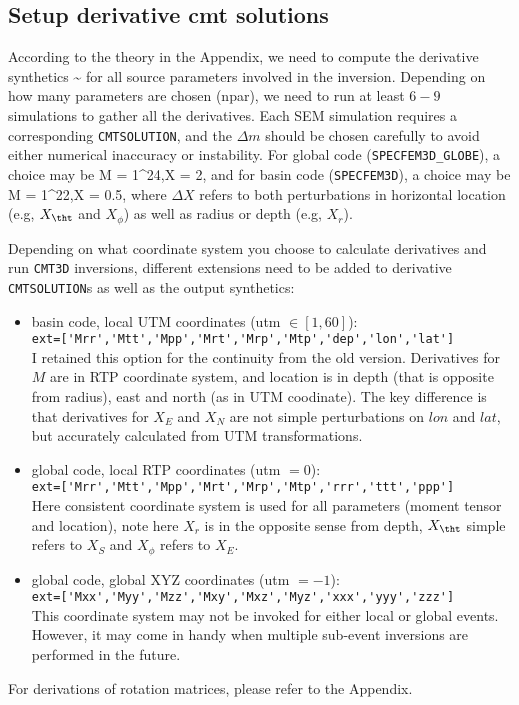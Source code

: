 \documentclass[12pt,titlepage,fleqn]{article}
\begin{document}
\subsection{Setup derivative cmt solutions}
According to the theory in the Appendix, we need to compute the derivative synthetics 
\eq {} \sim {} \en
for all source parameters involved in the inversion. Depending on how many parameters are chosen (npar), we need to run at least $6-9$ simulations to gather all the derivatives. Each SEM simulation requires a corresponding \verb+CMTSOLUTION+, and the $\Delta m$ should be chosen carefully to avoid either numerical inaccuracy or instability. For global code (\verb+SPECFEM3D_GLOBE+), a choice may be
\eq
\Delta M = 1^{24},\quad \Delta X = 2,
\en
and for basin code (\verb+SPECFEM3D+), a choice may be
\eq
\Delta M = 1^{22},\quad \Delta X = 0.5,
\en
where $\Delta X$ refers to both perturbations in horizontal location (e.g, $X_\tht$ and $X_\phi$) as well as radius or depth (e.g, $X_r$).

Depending on what coordinate system you choose to calculate derivatives and run \verb+CMT3D+ inversions, different extensions need to be added to derivative \verb+CMTSOLUTION+s as well as the output synthetics:
\begin{itemize}
\item basin code, local UTM coordinates (utm $\in[1,60]$): \\
   \verb+ext=['Mrr','Mtt','Mpp','Mrt','Mrp','Mtp','dep','lon','lat']+ \\
I retained this option for the continuity from the old version. Derivatives for $M$ are in RTP coordinate system, and location is in depth (that is opposite from radius), east and north (as in UTM coodinate). The key difference is that derivatives for $X_E$ and $X_N$ are not simple perturbations on $lon$ and $lat$, but accurately calculated from UTM transformations.
\item global code, local RTP coordinates (utm $=0$):\\
   \verb+ext=['Mrr','Mtt','Mpp','Mrt','Mrp','Mtp','rrr','ttt','ppp']+\\
Here consistent coordinate system is used for all parameters (moment tensor and location), note here $X_r$ is in the opposite sense from depth, $X_\tht$ simple refers to $X_S$ and $X_\phi$ refers to $X_E$.
\item global code, global XYZ coordinates (utm $=-1$):\\
   \verb+ext=['Mxx','Myy','Mzz','Mxy','Mxz','Myz','xxx','yyy','zzz']+\\
This coordinate system may not be invoked for either local or global events. However, it may come in handy when multiple sub-event inversions are performed in the future.
\end{itemize}
For derivations of rotation matrices, please refer to the Appendix.
\end{document}
